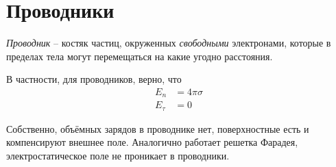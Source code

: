 \section{Проводники}

\begin{to_def}
    \textit{Проводник} -- костяк частиц, окруженных \textit{свободными} электронами, которые в пределах тела могут перемещаться на какие угодно
    расстояния. 
\end{to_def}

\begin{minipage}[c]{0.55\textwidth}
    В частности, для проводников, верно, что
    \begin{align}
        E_n &= 4 \pi \sigma \\
        E_\tau &= 0
    \end{align}
\end{minipage}
\hfill
\begin{minipage}[c]{0.35\textwidth}
\end{minipage}

Собственно, объёмных зарядов в проводнике нет, поверхностные есть и компенсируют внешнее поле. Аналогично работает решетка Фарадея, электростатическое поле не проникает в проводники.